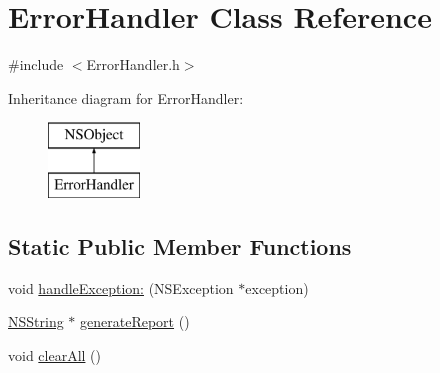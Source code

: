 \hypertarget{interface_error_handler}{
\section{\-Error\-Handler \-Class \-Reference}
\label{interface_error_handler}
}


{\ttfamily \#include $<$\-Error\-Handler.\-h$>$}

\-Inheritance diagram for \-Error\-Handler\-:\begin{figure}[H]
\begin{center}
\leavevmode
\includegraphics[height=2.000000cm]{interface_error_handler}
\end{center}
\end{figure}
\subsection*{\-Static \-Public \-Member \-Functions}
\begin{DoxyCompactItemize}
\item 
void \hyperlink{interface_error_handler_a2824725ef2ae3e2020a767db761820c2}{handle\-Exception\-:} (\-N\-S\-Exception $\ast$exception)
\item 
\hyperlink{class_n_s_string}{\-N\-S\-String} $\ast$ \hyperlink{interface_error_handler_a885625bf0f580c686449cf9e93d0a3a7}{generate\-Report} ()
\item 
void \hyperlink{interface_error_handler_ad9bf00bc45f36bf2a09ae9f2fcd393a3}{clear\-All} ()
\end{DoxyCompactItemize}


